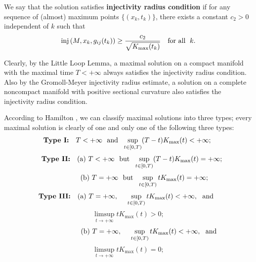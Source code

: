 \begin{definition}
  \label{def:cz-injectivity-radius-condition-at-almost-maximum-points}
We say that the solution satisfies {\bf injectivity radius
condition} if for any sequence
of (almost) maximum points $\{(x_k,t_k)\}$, there exists a
constant $c_2>0$ independent of $k$ such that
$$
{\rm inj}\,(M,x_k,g_{ij}(t_k))\geq \frac{c_2}{\sqrt{K_{\max}(t_k)}} \quad
\text{for all }\;   k.
$$
\end{definition}

Clearly, by the Little Loop Lemma, a maximal solution on a compact
manifold with the maximal time $T<+\infty$ always satisfies the
injectivity radius condition. Also by the Gromoll-Meyer
injectivity radius estimate, a solution on a complete noncompact
manifold with positive sectional curvature also satisfies the
injectivity radius condition.

According to Hamilton \cite{Ha95F}, we can classify maximal
solutions into three types; every maximal solution is clearly of
one and only one of the following three types:
$$
\mbox{\textbf{Type I:}} \ \ \ T<+\infty\ \  \mbox{and}\ \
\sup_{t\in [0,T)}(T-t)K_{\max}(t)<+\infty;\
$$
$$
\ \ \ \mbox{\textbf{Type II:}} \ \ \ \text{(a)}\  T<+\infty\ \
\mbox{but}\ \ \sup_{t\in [0,T)}(T-t)K_{\max}(t)=+\infty;
$$
\index{type II!(a)}
$$
 \hskip 2.3cm \text{(b)}\  T=+\infty\ \  \mbox{but}\ \
\sup_{t\in [0,T)}tK_{\max}(t)=+\infty;\ \ \ \ \ \
$$
\index{type II!(b)}
$$
\mbox{\textbf{Type III:}} \ \ \ \text{(a)}\  T=+\infty,\ \ \ \
\sup_{t\in [0,T)}tK_{\max}(t)<+\infty,\ \ \mbox{and} \ \
$$
$$ \limsup_{t\rightarrow
+\infty}tK_{\max}(t)>0;
$$
$$
\hskip 2.3cm \text{(b)}\  T=+\infty,\ \ \ \  \sup_{t\in
[0,T)}tK_{\max}(t)<+\infty,\ \ \mbox{and} \ \
$$
$$ \limsup_{t\rightarrow
+\infty}tK_{\max}(t)=0;
$$
\index{type III!(b)}

